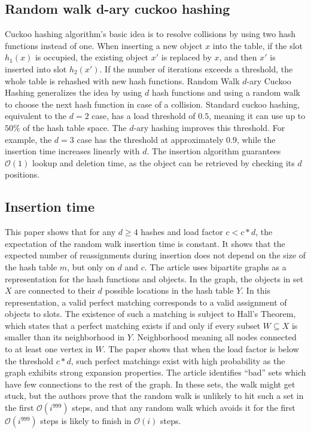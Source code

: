 \subsection{Random walk d-ary cuckoo hashing}
Cuckoo hashing algorithm's basic idea is to resolve collisions by using two hash functions instead of one. When inserting a new object $x$ into the table, if the slot $h_1(x)$ is occupied, the existing object $x'$ is replaced by $x$, and then $x'$ is inserted into slot $h_2(x')$. If the number of iterations exceeds a threshold, the whole table is rehashed with new hash functions. Random Walk $d$-ary Cuckoo Hashing generalizes the idea by using $d$ hash functions and using a random walk to choose the next hash function in case of a collision. Standard cuckoo hashing, equivalent to the $d = 2$ case, has a load threshold of $0.5$, meaning it can use up to $50\%$ of the hash table space. The $d$-ary hashing improves this threshold. For example, the $d = 3$ case has the threshold at approximately $0.9$, while the insertion time increases linearly with $d$. The insertion algorithm guarantees $\mathcal{O}(1)$ lookup and deletion time, as the object can be retrieved by checking its $d$ positions.

\subsection{Insertion time}
This paper shows that for any $d \geq 4$ hashes and load factor $c < c*d$, the expectation of the random walk insertion time is constant. It shows that the expected number of reassignments during insertion does not depend on the size of the hash table $m$, but only on $d$ and $c$. The article uses bipartite graphs as a representation for the hash functions and objects. In the graph, the objects in set $X$ are connected to their $d$ possible locations in the hash table $Y$. In this representation, a valid perfect matching corresponds to a valid assignment of objects to slots. The existence of such a matching is subject to Hall’s Theorem, which states that a perfect matching exists if and only if every subset $W \subseteq X$ is smaller than its neighborhood in $Y$. Neighborhood meaning all nodes connected to at least one vertex in $W$. The paper shows that when the load factor is below the threshold $c*d$, such perfect matchings exist with high probability as the graph exhibits strong expansion properties. The article identifies ``bad'' sets which have few connections to the rest of the graph. In these sets, the walk might get stuck, but the authors prove that the random walk is unlikely to hit such a set in the first $\mathcal{O}(i^{999})$ steps, and that any random walk which avoids it for the first $\mathcal{O}(i^{999})$ steps is likely to finish in $\mathcal{O}(i)$ steps.

